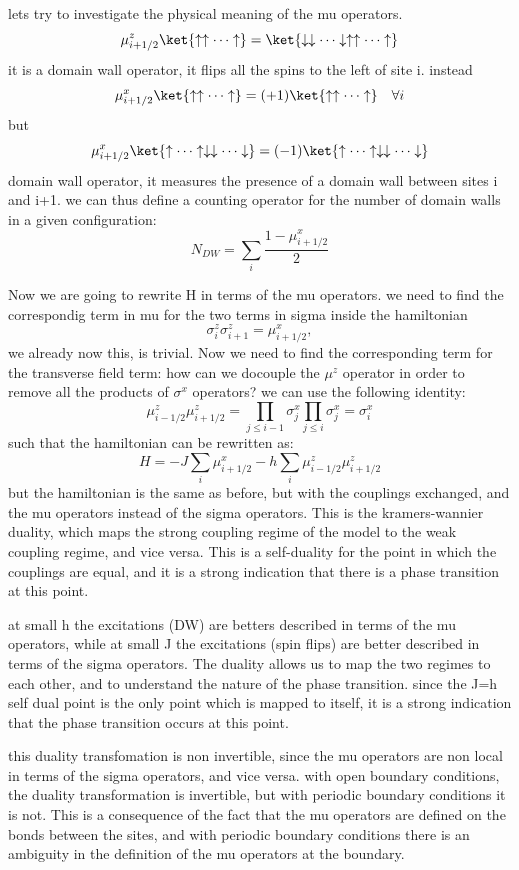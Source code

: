 lets try to investigate the physical meaning of the mu operators.
\[
    \mu^z_{i+1/2} \ket{\uparrow \uparrow \cdots \uparrow} = \ket{\downarrow \downarrow \cdots \downarrow \uparrow \uparrow \cdots \uparrow}
\]
it is a domain wall operator, it flips all the spins to the left of site i. instead
\[
    \mu^x_{i+1/2} \ket{\uparrow \uparrow \cdots \uparrow} = (+1)\ket{\uparrow \uparrow \cdots \uparrow} \quad \forall i
\]
but
\[
    \mu^x_{i+1/2} \ket{\uparrow \cdots \uparrow \downarrow \downarrow \cdots \downarrow} = (-1)\ket{\uparrow \cdots \uparrow \downarrow \downarrow \cdots \downarrow}
\]
domain wall operator, it measures the presence of a domain wall between sites i and i+1. we can thus define a counting operator for the number of domain walls in a given configuration:
\[
    N_{DW} = \sum_i \frac{1 - \mu^x_{i+1/2}}{2}
\]

Now we are going to rewrite H in terms of the mu operators. we need to find the correspondig term in mu for the two terms in sigma inside the hamiltonian
\[
    \sigma^z_i \sigma^z_{i+1} = \mu^x_{i+1/2},
\]
we already now this, is trivial. Now we need to find the corresponding term for the transverse field term: how can we docouple the \(\mu^z\) operator in order to remove all the products of \(\sigma^x\) operators? we can use the following identity:
\[
    \mu^z_{i-1/2} \mu^z_{i+1/2} = \prod_{j\leq i-1} \sigma^x_j \prod_{j\leq i} \sigma^x_j = \sigma^x_i
\]
such that the hamiltonian can be rewritten as:
\[
    H = -J \sum_{i} \mu^x_{i+1/2} - h \sum_i \mu^z_{i-1/2} \mu^z_{i+1/2}
\]
but the hamiltonian is the same as before, but with the couplings exchanged, and the mu operators instead of the sigma operators. This is the kramers-wannier duality, which maps the strong coupling regime of the model to the weak coupling regime, and vice versa. This is a self-duality for the point in which the couplings are equal, and it is a strong indication that there is a phase transition at this point.

at small h the excitations (DW) are betters described in terms of the mu operators, while at small J the excitations (spin flips) are better described in terms of the sigma operators. The duality allows us to map the two regimes to each other, and to understand the nature of the phase transition. since the J=h self dual point is the only point which is mapped to itself, it is a strong indication that the phase transition occurs at this point.

this duality transfomation is non invertible, since the mu operators are non local in terms of the sigma operators, and vice versa. with open boundary conditions, the duality transformation is invertible, but with periodic boundary conditions it is not. This is a consequence of the fact that the mu operators are defined on the bonds between the sites, and with periodic boundary conditions there is an ambiguity in the definition of the mu operators at the boundary.

